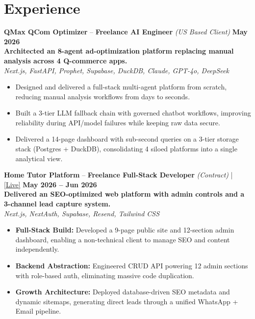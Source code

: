 \documentclass[a4paper,9pt]{extarticle}
\newenvironment{cvlist}{%
  \begin{itemize}[nosep, leftmargin=1.2em, itemsep=0.5pt, topsep=1pt, label=\textbullet, after=\vspace{2pt}]
}{%
  \end{itemize}
}
\begin{document}
\section{Experience}

\noindent\textbf{QMax QCom Optimizer} -- \textbf{Freelance AI Engineer} \textit{(US Based Client)} \hfill \textbf{May 2026}\\[1pt]
\textbf{Architected an 8-agent ad-optimization platform replacing manual analysis across 4 Q-commerce apps.}\\[1pt]
\noindent\textit{Next.js, FastAPI, Prophet, Supabase, DuckDB, Claude, GPT-4o, DeepSeek}
\begin{cvlist}
\item Designed and delivered a full-stack multi-agent platform from scratch, reducing manual analysis workflows from days to seconds.
\item  Built a 3-tier LLM fallback chain with governed chatbot workflows, improving reliability during API/model failures while keeping raw data secure.
  \item  Delivered a 14-page dashboard with sub-second queries on a 3-tier storage stack (Postgres + DuckDB), consolidating 4 siloed platforms into a single analytical view.
\end{cvlist}

\noindent\textbf{Home Tutor Platform} -- \textbf{Freelance Full-Stack Developer} \textit{(Contract)} | \href{https://abha.prakhargupta.me/}{\small [Live]} \hfill \textbf{May 2026 -- Jun 2026}\\[1pt]
\textbf{Delivered an SEO-optimized web platform with admin controls and a 3-channel lead capture system.}\\[1pt]
\noindent\textit{Next.js, NextAuth, Supabase, Resend, Tailwind CSS}
\begin{cvlist}
  \item \textbf{Full-Stack Build:} Developed a 9-page public site and 12-section admin dashboard, enabling a non-technical client to manage SEO and content independently.
  \item \textbf{Backend Abstraction:} Engineered CRUD API powering 12 admin sections with role-based auth, eliminating massive code duplication.
  \item \textbf{Growth Architecture:} Deployed database-driven SEO metadata and dynamic sitemaps, generating direct leads through a unified WhatsApp + Email pipeline.
\end{cvlist}
\end{document}
